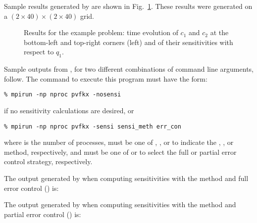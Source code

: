 Sample results generated by  are shown in Fig.~\ref{f:pvfkx}. 
These results were generated on a $(2\times40)\times(2\times40)$ grid.
\begin{figure}
  {\centerline{}}
  \caption{Results for the  example problem:
    time evolution of $c_1$ and $c_2$ at the bottom-left and top-right corners
    (left) and of their sensitivities with respect to $q_1$.}
  \label{f:pvfkx}
\end{figure}

Sample outputs from , for two different combinations of command line arguments, 
follow. The command to execute this program must have the form:
\begin{verbatim}
% mpirun -np nproc pvfkx -nosensi
\end{verbatim} 
if no sensitivity calculations are desired, or
\begin{verbatim}
% mpirun -np nproc pvfkx -sensi sensi_meth err_con
\end{verbatim}
where  is the number of processes,  must be one of , 
, or  to
indicate the , , or  method,
respectively, and  must be one of  or  to
select the full or partial error control strategy, respectively.

The output generated by  when computing sensitivities with the 
method and full error control () is:


The output generated by  when computing sensitivities with the 
method and partial error control () is:


